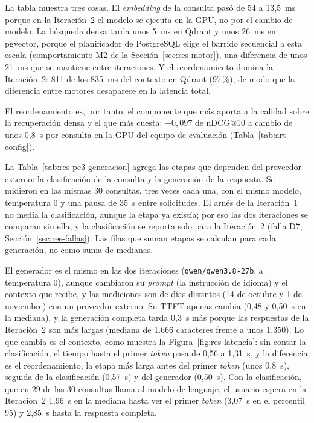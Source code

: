 

La tabla muestra tres cosas. El \textit{embedding} de la consulta pasó de 54 a 13,5~ms porque en la Iteración~2 el modelo se ejecuta en la GPU, no por el cambio de modelo. La búsqueda densa tarda unos 5~ms en Qdrant y unos 26~ms en pgvector, porque el planificador de PostgreSQL elige el barrido secuencial a esta escala (comportamiento M2 de la Sección~\ref{sec:res-motor}), una diferencia de unos 21~ms que se mantiene entre iteraciones. Y el reordenamiento domina la Iteración~2: 811 de los 835~ms del contexto en Qdrant (97\,\%), de modo que la diferencia entre motores desaparece en la latencia total.

El reordenamiento es, por tanto, el componente que más aporta a la calidad sobre la recuperación densa y el que más cuesta: $+0{,}097$ de nDCG@10 a cambio de unos 0,8~s por consulta en la GPU del equipo de evaluación (Tabla~\ref{tab:art-config}).

La Tabla~\ref{tab:res-pe3-generacion} agrega las etapas que dependen del proveedor externo: la clasificación de la consulta y la generación de la respuesta. Se midieron en las mismas 30 consultas, tres veces cada una, con el mismo modelo, temperatura 0 y una pausa de 35~s entre solicitudes. El arnés de la Iteración~1 no medía la clasificación, aunque la etapa ya existía; por eso las dos iteraciones se comparan sin ella, y la clasificación se reporta solo para la Iteración~2 (falla D7, Sección~\ref{sec:res-fallas}). Las filas que suman etapas se calculan para cada generación, no como suma de medianas.



El generador es el mismo en las dos iteraciones (\texttt{qwen/qwen3.8-27b}, a temperatura 0), aunque cambiaron su \textit{prompt} (la instrucción de idioma) y el contexto que recibe, y las mediciones son de días distintos (14 de octubre y 1 de noviembre) con un proveedor externo. Su TTFT apenas cambia (0,48 y 0,50~s en la mediana), y la generación completa tarda 0,3~s más porque las respuestas de la Iteración~2 son más largas (mediana de 1.666 caracteres frente a unos 1.350). Lo que cambia es el contexto, como muestra la Figura~\ref{fig:res-latencia}: sin contar la clasificación, el tiempo hasta el primer \textit{token} pasa de 0,56 a 1,31~s, y la diferencia es el reordenamiento, la etapa más larga antes del primer \textit{token} (unos 0,8~s), seguida de la clasificación (0,57~s) y del generador (0,50~s). Con la clasificación, que en 29 de las 30 consultas llama al modelo de lenguaje, el usuario espera en la Iteración~2 1,96~s en la mediana hasta ver el primer \textit{token} (3,07~s en el percentil 95) y 2,85~s hasta la respuesta completa.

